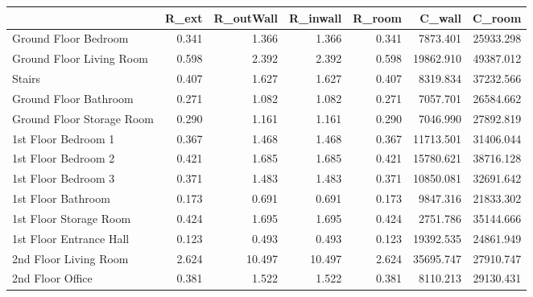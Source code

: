 \begin{tabular}{lrrrrrr}
\toprule
{} &  R\_ext &  R\_outWall &  R\_inwall &  R\_room &    C\_wall &    C\_room \\
\midrule
Ground Floor Bedroom      &  0.341 &      1.366 &     1.366 &   0.341 &  7873.401 & 25933.298 \\
Ground Floor Living Room  &  0.598 &      2.392 &     2.392 &   0.598 & 19862.910 & 49387.012 \\
Stairs                    &  0.407 &      1.627 &     1.627 &   0.407 &  8319.834 & 37232.566 \\
Ground Floor Bathroom     &  0.271 &      1.082 &     1.082 &   0.271 &  7057.701 & 26584.662 \\
Ground Floor Storage Room &  0.290 &      1.161 &     1.161 &   0.290 &  7046.990 & 27892.819 \\
1st Floor Bedroom 1       &  0.367 &      1.468 &     1.468 &   0.367 & 11713.501 & 31406.044 \\
1st Floor Bedroom 2       &  0.421 &      1.685 &     1.685 &   0.421 & 15780.621 & 38716.128 \\
1st Floor Bedroom 3       &  0.371 &      1.483 &     1.483 &   0.371 & 10850.081 & 32691.642 \\
1st Floor Bathroom        &  0.173 &      0.691 &     0.691 &   0.173 &  9847.316 & 21833.302 \\
1st Floor Storage Room    &  0.424 &      1.695 &     1.695 &   0.424 &  2751.786 & 35144.666 \\
1st Floor Entrance Hall   &  0.123 &      0.493 &     0.493 &   0.123 & 19392.535 & 24861.949 \\
2nd Floor Living Room     &  2.624 &     10.497 &    10.497 &   2.624 & 35695.747 & 27910.747 \\
2nd Floor Office          &  0.381 &      1.522 &     1.522 &   0.381 &  8110.213 & 29130.431 \\
\bottomrule
\end{tabular}
